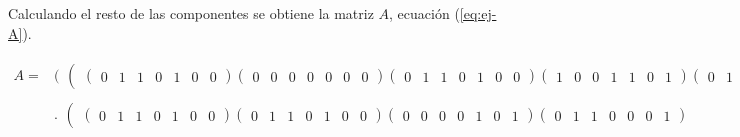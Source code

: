 Calculando el resto de las componentes se obtiene la matriz $A$, ecuación (\ref{eq:ej-A}).

\begin{equation}\label{eq:ej-A}
	\begin{aligned}
	{A} = & \bigg(\begin{matrix}\left(\begin{matrix}
				\left(\begin{smallmatrix}
					0 & 1 & 1 & 0 & 1 & 0 & 0
				\end{smallmatrix}\right)
		
				\left(\begin{smallmatrix}
					0 & 0 & 0 & 0 & 0 & 0 & 0
				\end{smallmatrix}\right)
		
				\left(\begin{smallmatrix}
					0 & 1 & 1 & 0 & 1 & 0 & 0
				\end{smallmatrix}\right)
			
				\left(\begin{smallmatrix}
					1 & 0 & 0 & 1 & 1 & 0 & 1
				\end{smallmatrix}\right)
				
				\left(\begin{smallmatrix}
					0 & 1 & 1 & 0 & 0 & 0 & 1
				\end{smallmatrix}\right)
				
				\left(\begin{smallmatrix}
					0 & 0 & 0 & 0 & 1 & 0 & 1
				\end{smallmatrix}\right)
			\end{matrix}\right)\end{matrix}\bigg.\\
			&
			\bigg.\begin{matrix}\left(\begin{matrix}
				\left(\begin{smallmatrix}
					0 & 1 & 1 & 0 & 1 & 0 & 0
				\end{smallmatrix}\right)
		
				\left(\begin{smallmatrix}
					0 & 1 & 1 & 0 & 1 & 0 & 0
				\end{smallmatrix}\right)
		
				\left(\begin{smallmatrix}
					0 & 0 & 0 & 0 & 1 & 0 & 1
				\end{smallmatrix}\right)
				
				\left(\begin{smallmatrix}
					0 & 1 & 1 & 0 & 0 & 0 & 1
				\end{smallmatrix}\right)
				

\end{matrix}
\end{matrix}
\end{aligned}
\end{equation}
